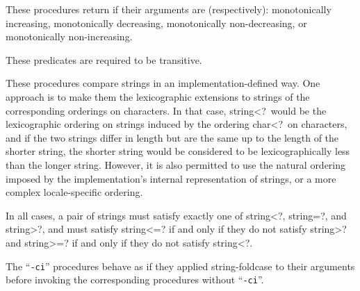 \begin{entry}{
}

These procedures return \schtrue{} if their arguments are (respectively):
monotonically increasing, monotonically decreasing,
monotonically non-decreasing, or monotonically non-increasing.

These predicates are required to be transitive.

These procedures compare strings in an implementation-defined way.
One approach is to make them the lexicographic extensions to strings of
the corresponding orderings on characters.  In that case, {\cf string<?}\
would be the lexicographic ordering on strings induced by the ordering
{\cf char<?}\ on characters, and if the two strings differ in length but
are the same up to the length of the shorter string, the shorter string
would be considered to be lexicographically less than the longer string.
However, it is also permitted to use the natural ordering imposed by the
implementation's internal representation of strings, or a more complex locale-specific
ordering.

In all cases, a pair of strings must satisfy exactly one of
{\cf string<?}, {\cf string=?}, and {\cf string>?}, and must satisfy
{\cf string<=?} if and only if they do not satisfy {\cf string>?} and
{\cf string>=?} if and only if they do not satisfy {\cf string<?}.

The \hbox{``{\tt -ci}''} procedures behave as if they applied
{\cf string-foldcase} to their arguments before invoking the corresponding
procedures without  \hbox{``{\tt -ci}''}.


\end{entry}

